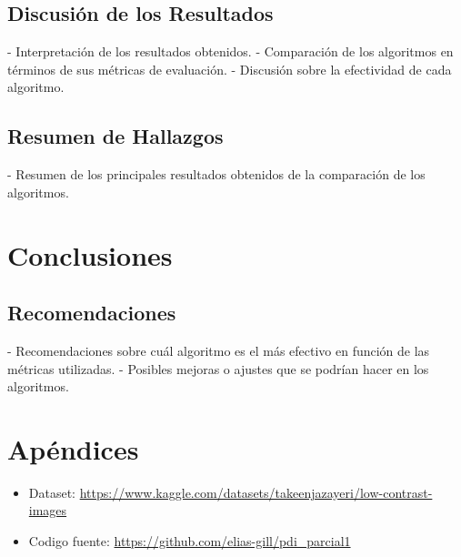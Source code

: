 \documentclass[sigchi]{acmart}
\begin{document}
\subsection{Discusión de los Resultados}
\label{subsec:discusion}

- Interpretación de los resultados obtenidos.
- Comparación de los algoritmos en términos de sus métricas de evaluación.
- Discusión sobre la efectividad de cada algoritmo.

\subsection{Resumen de Hallazgos}
\label{subsec:resumen}
- Resumen de los principales resultados obtenidos de la comparación de los algoritmos.

\section{Conclusiones}
\label{sec:conclusiones}

\subsection{Recomendaciones}
\label{subsec:recomendaciones}
- Recomendaciones sobre cuál algoritmo es el más efectivo en función de las métricas utilizadas.
- Posibles mejoras o ajustes que se podrían hacer en los algoritmos.

\section{Apéndices}
\label{sec:apendices}

\begin{itemize}
	\item Dataset: \url{https://www.kaggle.com/datasets/takeenjazayeri/low-contrast-images}
	\item Codigo fuente: \url{https://github.com/elias-gill/pdi_parcial1}
\end{itemize}

\nocite{*} %


\label{sec:bibliography}
\end{document}
